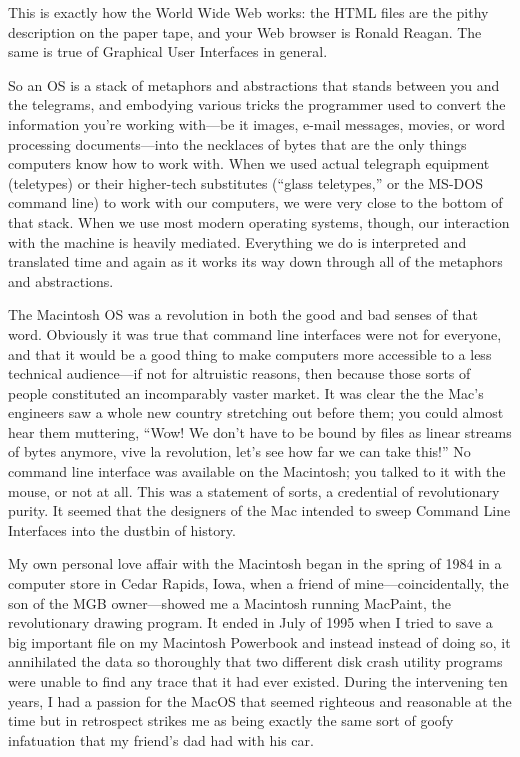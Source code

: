 \documentclass[
  fontsize=11pt,
  paper=landscape,
  twocolumn=true,
  pagesize=pdftex,
  headings=small,
  DIV=15,
  ]{scrartcl}
\begin{document}
This is exactly how the World Wide Web works: the HTML files are the
pithy description on the paper tape, and your Web browser is Ronald
Reagan. The same is true of Graphical User Interfaces in general.

So an OS is a stack of metaphors and abstractions that stands between
you and the telegrams, and embodying various tricks the programmer used
to convert the information you're working with---be it images, e-mail
messages, movies, or word processing documents---into the necklaces of
bytes that are the only things computers know how to work with. When we
used actual telegraph equipment (teletypes) or their higher-tech
substitutes (``glass teletypes,'' or the MS-DOS command line) to work
with our computers, we were very close to the bottom of that stack. When
we use most modern operating systems, though, our interaction with the
machine is heavily mediated. Everything we do is interpreted and
translated time and again as it works its way down through all of the
metaphors and abstractions.

The Macintosh OS was a revolution in both the good and bad senses of
that word. Obviously it was true that command line interfaces were not
for everyone, and that it would be a good thing to make computers more
accessible to a less technical audience---if not for altruistic reasons,
then because those sorts of people constituted an incomparably vaster
market. It was clear the the Mac's engineers saw a whole new country
stretching out before them; you could almost hear them muttering, ``Wow!
We don't have to be bound by files as linear streams of bytes anymore,
vive la revolution, let's see how far we can take this!'' No command
line interface was available on the Macintosh; you talked to it with the
mouse, or not at all. This was a statement of sorts, a credential of
revolutionary purity. It seemed that the designers of the Mac intended
to sweep Command Line Interfaces into the dustbin of history.

My own personal love affair with the Macintosh began in the spring of
1984 in a computer store in Cedar Rapids, Iowa, when a friend of
mine---coincidentally, the son of the MGB owner---showed me a Macintosh
running MacPaint, the revolutionary drawing program. It ended in July of
1995 when I tried to save a big important file on my Macintosh Powerbook
and instead instead of doing so, it annihilated the data so thoroughly
that two different disk crash utility programs were unable to find any
trace that it had ever existed. During the intervening ten years, I had
a passion for the MacOS that seemed righteous and reasonable at the time
but in retrospect strikes me as being exactly the same sort of goofy
infatuation that my friend's dad had with his car.
\end{document}
